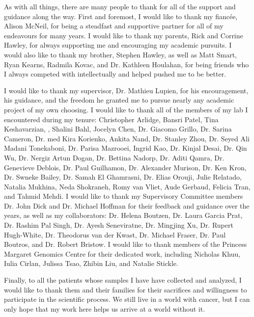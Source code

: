 \begin{acknowledgements}

  As with all things, there are many people to thank for all of the support and guidance along the way.
  First and foremost, I would like to thank my fianc\'ee, Alison McNeil, for being a steadfast and supportive partner for all of my endeavours for many years.
  I would like to thank my parents, Rick and Corrine Hawley, for always supporting me and encouraging my academic pursuits.
  I would also like to thank my brother, Stephen Hawley, as well as Matt Smart, Ryan Kearns, Radmila Kovac, and Dr. Kathleen Houlahan, for being friends who I always competed with intellectually and helped pushed me to be better.

  I would like to thank my supervisor, Dr. Mathieu Lupien, for his encouragement, his guidance, and the freedom he granted me to pursue nearly any academic project of my own choosing.
  I would like to thank all of the members of my lab I encountered during my tenure: Christopher Arlidge, Bansri Patel, Tina Keshavarzian, , Shalini Bahl, Jocelyn Chen, Dr. Giacomo Grillo, Dr. Sarina Cameron, Dr. med Kira Korienko, Ankita Nand, Dr. Stanley Zhou, Dr. Seyed Ali Madani Tonekaboni, Dr. Parisa Mazrooei, Ingrid Kao, Dr. Kinjal Desai, Dr. Qin Wu, Dr. Nergiz Artun Dogan, Dr. Bettina Nadorp, Dr. Aditi Qamra, Dr. Genevieve Deblois, Dr. Paul Guilhamon, Dr. Alexander Murison, Dr. Ken Kron, Dr. Swneke Bailey, Dr. Samah El Ghamrasni, Dr. Elias Orouji, Julie Relatado, Natalia Mukhina, Neda Shokraneh, Romy van Vliet, Aude Gerbaud, Felicia Tran, and Tahmid Mehdi.
  I would like to thank my Supervisory Committee members Dr. John Dick and Dr. Michael Hoffman for their feedback and guidance over the years, as well as my collaborators: Dr. Helena Boutzen, Dr. Laura Garcia Prat, Dr. Rashim Pal Singh, Dr. Ayesh Seneviratne, Dr. Mingjing Xu, Dr. Rupert Hugh-White, Dr. Theodorus van der Kwast, Dr. Michael Fraser, Dr. Paul Boutros, and Dr. Robert Bristow.
  I would like to thank members of the Princess Margaret Genomics Centre for their dedicated work, including Nicholas Khuu, Iulia Cirlan, Julissa Tsao, Zhibin Liu, and Natalie Stickle.

  Finally, to all the patients whose samples I have have collected and analyzed, I would like to thank them and their families for their sacrifices and willingness to participate in the scientific process.
  We still live in a world with cancer, but I can only hope that my work here helps us arrive at a world without it.
\end{acknowledgements}
